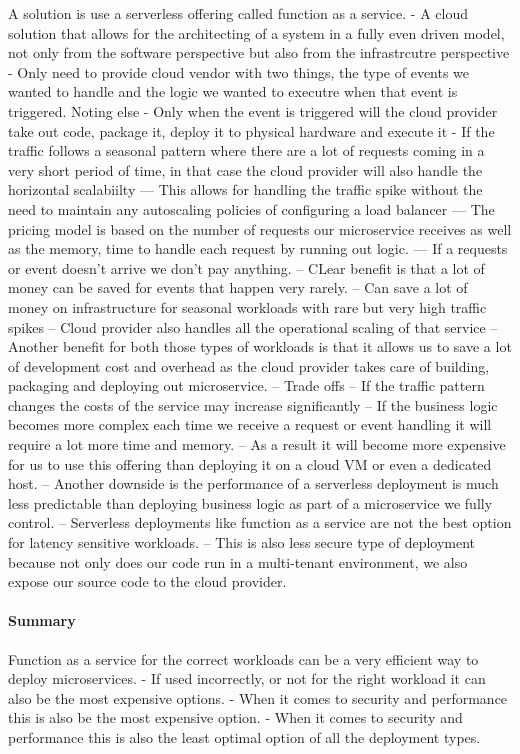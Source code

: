 \documentclass[a4paper, 11pt]{book}
\begin{document}
{    A solution is use a serverless offering called function as a service.
    - A cloud solution that allows for the architecting of a system in a fully even driven model, not only from the software perspective but also from the infrastrcutre perspective
    - Only need to provide cloud vendor with two things, the type of events we wanted to handle and the logic we wanted to executre when that event is triggered. Noting else
    - Only when the event is triggered will the cloud provider take out code, package it, deploy it to physical hardware and execute it
    - If the traffic follows a seasonal pattern where there are a lot of requests coming in a very short period of time, in that case the cloud provider will also handle the horizontal scalabiilty
    --- This allows for handling the traffic spike without the need to maintain any autoscaling policies of configuring a load balancer
    --- The pricing model is based on the number of requests our microservice receives as well as the memory, time to handle each request by running out logic.
    --- If a requests or event doesn't arrive we don't pay anything.
    -- CLear benefit is that a lot of money can be saved for events that happen very rarely.
    -- Can save a lot of money on infrastructure for seasonal workloads with rare but very high traffic spikes
    -- Cloud provider also handles all the operational scaling of that service
    -- Another benefit for both those types of workloads is that it allows us to save a lot of development cost and overhead as the cloud provider takes care of building, packaging and deploying out microservice.
    -- Trade offs
    -- If the traffic pattern changes the costs of the service may increase significantly
    -- If the business logic becomes more complex each time we receive a request or event handling it will require a lot more time and memory.
    -- As a result it will become more expensive for us to use this offering than deploying it on a cloud VM or even a dedicated host.
    -- Another downside is the performance of a serverless deployment is much less predictable than deploying business logic as part of a microservice we fully control.
    -- Serverless deployments like function as a service are not the best option for latency sensitive workloads.
    -- This is also less secure type of deployment because not only does our code run in a multi-tenant environment, we also expose our source code to the cloud provider.

    \paragraph{Summary}
    Function as a service for the correct workloads can be a very efficient way to deploy microservices.
    - If used incorrectly, or not for the right workload it can also be the most expensive options.
    - When it comes to security and performance this is also be the most expensive option.
    - When it comes to security and performance this is also the least optimal option of all the deployment types.

}
\end{document}
